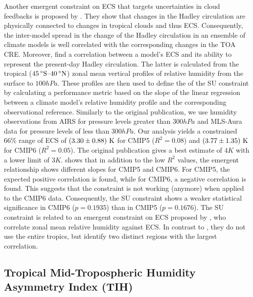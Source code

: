 Another emergent constraint on \ac{ECS} that targets uncertainties in cloud
feedbacks is proposed by \textcite{Su2014}. They show that changes in the
Hadley circulation are physically connected to changes in tropical clouds and
thus \ac{ECS}. Consequently, the inter-model spread in the change of the Hadley
circulation in an ensemble of climate models is well correlated with the
corresponding changes in the \ac{TOA} \ac{CRE}. Moreover, \textcite{Su2014}
find a correlation between a model's \ac{ECS} and its ability to represent the
present-day Hadley circulation. The latter is calculated from the tropical
($\range{45 \unit{\degree S}}{40 \unit{\degree N}}$) zonal mean vertical
profiles of relative humidity from the surface to $100 \unit{hPa}$. These
profiles are then used to define the \xaxis{} of the SU constraint by
calculating a performance metric based on the slope of the linear regression
between a climate model's relative humidity profile and the corresponding
observational reference. Similarly to the original publication, we use humidity
observations from AIRS \autocite{Aumann2003} for pressure levels greater than
$300 \unit{hPa}$ and MLS-Aura data \autocite{Beer2006} for pressure levels of
less than $300 \unit{hPa}$. Our analysis yields a constrained $66 \unit{\%}$
range of \ac{ECS} of $\pmrangeunit{3.30}{0.88}{K}$ for \acs{CMIP}5 ($R^2 =
0.08$) and $\pmrangeunit{3.77}{1.35}{K}$ for \acs{CMIP}6 ($R^2 = 0.05$). The
original publication gives a best estimate of $4 \unit{K}$ with a lower limit
of $3 \unit{K}$.  shows that in addition to the low
$R^2$ values, the emergent relationship shows different slopes for \acs{CMIP}5
and \acs{CMIP}6. For \acs{CMIP}5, the expected positive correlation is found,
while for \acs{CMIP}6, a negative correlation is found. This suggests that the
constraint is not working (anymore) when applied to the \acs{CMIP}6 data.
Consequently, the SU constraint shows a weaker statistical significance in
\acs{CMIP}6 ($p = 0.1935$) than in \acs{CMIP}5 ($p = 0.1676$). The SU
constraint is related to an emergent constraint on \ac{ECS} proposed by
\textcite{Fasullo2012}, who correlate  zonal mean relative
humidity against \ac{ECS}. In contrast to \textcite{Su2014}, they do not use
the entire tropics, but identify two distinct regions with the largest
correlation.


\subsection{Tropical Mid-Tropospheric Humidity Asymmetry Index (TIH)}
\label{subsec:05:tih}

